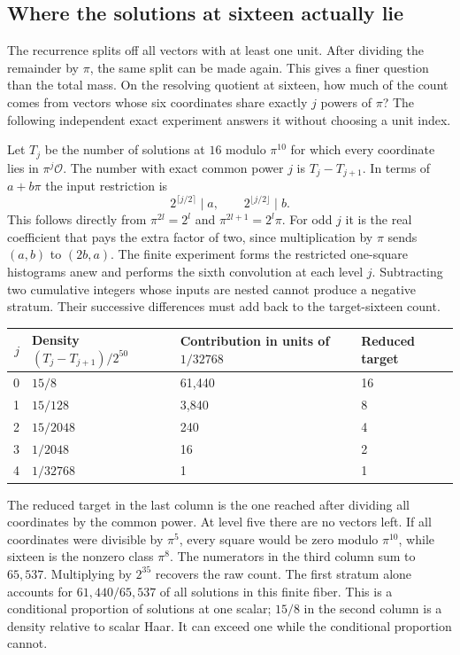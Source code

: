 \documentclass[12pt,letterpaper]{article}
\begin{document}
\subsection{Where the solutions at sixteen actually lie}
The recurrence splits off all vectors with at least one unit. After dividing the remainder by $\pi$, the same split can be made again. This gives a finer question than the total mass. On the resolving quotient at sixteen, how much of the count comes from vectors whose six coordinates share exactly $j$ powers of $\pi$? The following independent exact experiment answers it without choosing a unit index.

Let $T_j$ be the number of solutions at $16$ modulo $\pi^{10}$ for which every coordinate lies in $\pi^j\mathcal O$. The number with exact common power $j$ is $T_j-T_{j+1}$. In terms of $a+b\pi$ the input restriction is
\[
  2^{\lceil j/2\rceil}\mid a,\qquad
  2^{\lfloor j/2\rfloor}\mid b .
\]
This follows directly from $\pi^{2l}=2^l$ and $\pi^{2l+1}=2^l\pi$. For odd $j$ it is the real coefficient that pays the extra factor of two, since multiplication by $\pi$ sends $(a,b)$ to $(2b,a)$. The finite experiment forms the restricted one-square histograms anew and performs the sixth convolution at each level $j$. Subtracting two cumulative integers whose inputs are nested cannot produce a negative stratum. Their successive differences must add back to the target-sixteen count.

\begin{center}\small\begin{tabular}{rlll}\toprule
$j$&Density $(T_j-T_{j+1})/2^{50}$&Contribution in units of $1/32768$&Reduced target\\\midrule
0&$15/8$&61,440&16\\
1&$15/128$&3,840&8\\
2&$15/2048$&240&4\\
3&$1/2048$&16&2\\
4&$1/32768$&1&1\\\bottomrule
\end{tabular}\end{center}
The reduced target in the last column is the one reached after dividing all coordinates by the common power. At level five there are no vectors left. If all coordinates were divisible by $\pi^5$, every square would be zero modulo $\pi^{10}$, while sixteen is the nonzero class $\pi^8$. The numerators in the third column sum to $65{,}537$. Multiplying by $2^{35}$ recovers the raw count. The first stratum alone accounts for $61{,}440/65{,}537$ of all solutions in this finite fiber. This is a conditional proportion of solutions at one scalar; $15/8$ in the second column is a density relative to scalar Haar. It can exceed one while the conditional proportion cannot.
\end{document}
